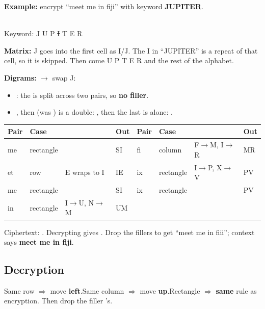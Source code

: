 \textbf{Example:} encrypt ``meet me in fiji'' with keyword \textbf{JUPITER}.

\begin{minipage}[c]{0.36\textwidth}
\centering
{}\\[2pt]
{\footnotesize Keyword: J U P \sout{I} T E R}
\end{minipage}\hfill
\begin{minipage}[c]{0.6\textwidth}
\textbf{Matrix:} J goes into the first cell as I/J. The I in ``JUPITER'' is a repeat of that cell, so it is skipped. Then come U P T E R and the rest of the alphabet.

\textbf{Digrams:}  $\to$ swap J: 
\begin{itemize}
  \item {}: the  is split across two pairs, so \textbf{no filler}.
  \item {}, then  (was ) is a double: , then the last  is alone: .
\end{itemize}
\end{minipage}

\begin{center}\small
\begin{tabular}{@{}llll|llll@{}}
\toprule
Pair & Case & & Out & Pair & Case & & Out\\
\midrule
me & rectangle & & SI & fi & column & F$\to$M, I$\to$R & MR\\
et & row & E wraps to I & IE & ix & rectangle & I$\to$P, X$\to$V & PV\\
me & rectangle & & SI & ix & rectangle & & PV\\
in & rectangle & I$\to$U, N$\to$M & UM & & & &\\
\bottomrule
\end{tabular}
\end{center}
Ciphertext: \textbf{}.\quad
Decrypting gives . Drop the fillers to get ``meet me in fiii''; context says \textbf{meet me in fiji}.

\subsection{Decryption}
\begin{keybox}[title=Reverse the rules]
Same row $\Rightarrow$ move \textbf{left}.\quad Same column $\Rightarrow$ move \textbf{up}.\quad Rectangle $\Rightarrow$ \textbf{same} rule as encryption. Then drop the filler 's.
\end{keybox}

